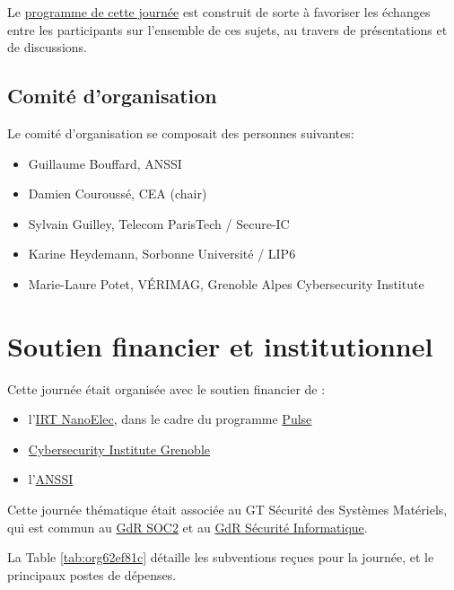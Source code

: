 \documentclass[a4paper,11pt]{article}
\begin{document}
Le \href{./programme.html}{programme de cette journée} est construit de sorte à favoriser les échanges entre les participants sur
l’ensemble de ces sujets, au travers de présentations et de
discussions.

\subsection{Comité d'organisation}
\label{sec:orgc7d5694}

Le comité d'organisation se composait des personnes suivantes:

\begin{itemize}
\item Guillaume Bouffard,  ANSSI
\item Damien Couroussé, CEA  (chair)
\item Sylvain Guilley, Telecom ParisTech / Secure-IC
\item Karine Heydemann, Sorbonne Université / LIP6
\item Marie-Laure Potet, VÉRIMAG,  Grenoble Alpes Cybersecurity Institute
\end{itemize}

\section{Soutien financier et institutionnel}
\label{sec:org0ce73ae}

Cette journée était organisée avec le soutien financier de :

\begin{itemize}
\item l'\href{http://www.irtnanoelec.fr}{IRT NanoElec}, dans le cadre du programme \href{http://www.irtnanoelec.fr/technologies-de-liaison}{Pulse}
\item \href{https://cybersecurity.univ-grenoble-alpes.fr/}{Cybersecurity Institute Grenoble}
\item l'\href{https://www.ssi.gouv.fr}{ANSSI}
\end{itemize}

Cette journée thématique était associée au GT Sécurité des Systèmes
Matériels, qui est commun au \href{http://www.gdr-soc.cnrs.fr}{GdR SOC2} et au \href{https://gdr-securite.irisa.fr}{GdR Sécurité Informatique}.

La Table \ref{tab:org62ef81c} détaille les subventions reçues pour la journée,
et le principaux postes de dépenses.
\end{document}
